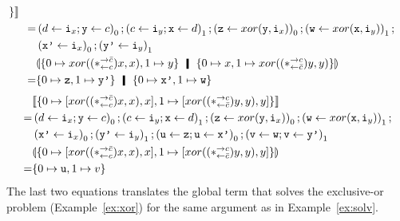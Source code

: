 \begin{example}
\begin{align*}
{  \}}
   \rrbracket\phantom{\hmid}\\
   =& \left(d\leftarrow \p i_x; \p y\leftarrow c\right)_0;
 \left(c\leftarrow \p i_y; \p x\leftarrow d\right)_1;
 \left(\p z\leftarrow xor(\p y,\p i_x)\right)_0;
 \left(\p w\leftarrow xor(\p x,\p i_y)\right)_1; \\
   & \left(\p{x'}\leftarrow \p i_x\right)_0;
     \left(\p{y'}\leftarrow \p i_y\right)_1 \\
&\llparenthesis
 {\{
  0\mapsto {xor((\comodL)x,x)}, 1\mapsto {y}
  \}}
  \hmid
  {\{
  0\mapsto {x},
  1\mapsto {xor((\comodR)y, y)}
  \}}
  \rrparenthesis\phantom{\hmid}\\
   =&
   \{0\mapsto \p z, 1\mapsto \p{y'}\} \hmid \{0\mapsto\p{x'}, 1\mapsto
   \p w\}
  \end{align*}
  \begin{align*}
   &\llbracket{
   \{
   0\mapsto [{{xor((\ast^{\rightarrow {\bar{c}}}_{\leftarrow{c}})x,x)},x}],
   1\mapsto [{{xor((\ast^{\rightarrow {c}}_{\leftarrow{\bar{c}}})y,y)},y}]
   \}}\rrbracket
   \\
   =&\left(d\leftarrow \texttt{i}_x; \texttt{y}\leftarrow c\right)_0;
   \left(c\leftarrow \texttt{i}_y; \texttt{x}\leftarrow d\right)_1;
   \left(\texttt{z}\leftarrow xor(\texttt{y},\texttt{i}_x)\right)_0;
   \left(\texttt{w}\leftarrow xor(\texttt{x},\texttt{i}_y)\right)_1; \\
   & \left(\texttt{x'}\leftarrow \texttt{i}_x\right)_0;
     \left(\texttt{y'}\leftarrow \texttt{i}_y\right)_1;
   \left(\texttt{u} \leftarrow \texttt{z}; \texttt{u} \leftarrow \texttt{x'}\right)_0 ;
   \left(\texttt{v}\leftarrow \texttt{w}; \texttt{v} \leftarrow \texttt{y'}\right)_1
   \\
   &\llparenthesis{
   \{
   0\mapsto [{{xor((\ast^{\rightarrow {\bar{c}}}_{\leftarrow{c}})x,x)},x}],
   1\mapsto [{{xor((\ast^{\rightarrow {c}}_{\leftarrow{\bar{c}}})y,y)},y}]
   \}}\rrparenthesis
   \\
   =&\{0\mapsto\texttt{u},1\mapsto v\}
  \end{align*}
  The last two equations translates the global term that solves the
  exclusive-or problem (Example~\ref{ex:xor}) for the same argument as
  in Example~\ref{ex:solv}.
 \end{example}

